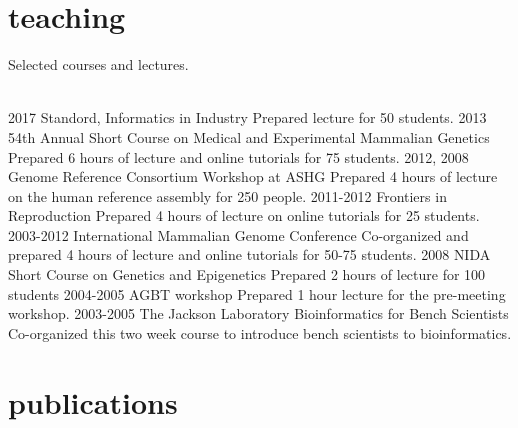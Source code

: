 \documentclass[]{dmc-cv} %
\begin{document}
\section{teaching}
Selected courses and lectures.\\
\\
\begin{entrylist}
\entry
{2017}
{Standord, Informatics in Industry}
{}
{Prepared lecture for 50 students.}
\entry
{2013}
{54th Annual Short Course on Medical and Experimental Mammalian Genetics}
{ }
{Prepared 6 hours of lecture and online tutorials for 75 students.}
\entry
{2012, 2008}
{Genome Reference Consortium Workshop at ASHG}
{ }
{Prepared 4 hours of lecture on the human reference assembly for 250 people.}
\entry
{2011-2012}
{Frontiers in Reproduction}
{ }
{Prepared 4 hours of lecture on online tutorials for 25 students.}
\entry
{2003-2012}
{International Mammalian Genome Conference}
{ }
{Co-organized and prepared 4 hours of lecture and online tutorials for 50-75 students.}
\entry
{2008}
{NIDA Short Course on Genetics and Epigenetics}
{ }
{Prepared 2 hours of lecture for 100 students }
\entry
{2004-2005}
{AGBT workshop}
{ }
{Prepared 1 hour lecture for the pre-meeting workshop.}
\entry
{2003-2005}
{The Jackson Laboratory Bioinformatics for Bench Scientists}
{ }
{Co-organized this two week course to introduce bench scientists to bioinformatics.}
\end{entrylist}


\section{publications}
\printbibliography[type=article, title={Articles in peer-reviewed journals}]
\nocite{*}

\printbibliography[type=unpublished, title={Preprints}]
\nocite{*}


\end{document}

